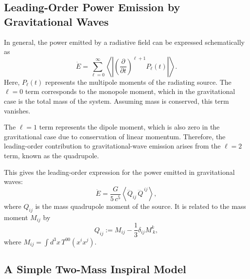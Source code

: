 \documentclass[11pt]{article}
\begin{document}

\subsection*{Leading-Order Power Emission by Gravitational Waves}
\label{subsec:GW_power}

In general, the power emitted by a radiative field can be expressed schematically as
\begin{equation}
    \dot{E} = \sum_{\ell = 0}^{\infty} \left\langle \left| \left( \frac{\partial}{\partial t} \right)^{\ell+1} P_\ell(t) \right| \right\rangle.
\end{equation}
Here, \(P_{\ell}(t)\) represents the multipole moments of the radiating source. The \(\ell = 0\) term corresponds to the monopole moment, which in the gravitational case is the total mass of the system. Assuming mass is conserved, this term vanishes.

\noindent
The \(\ell = 1\) term represents the dipole moment, which is also zero in the gravitational case due to conservation of linear momentum. Therefore, the leading-order contribution to gravitational-wave emission arises from the \(\ell = 2\) term, known as the quadrupole.

\noindent
This gives the leading-order expression for the power emitted in gravitational waves:
\begin{equation}
\dot{E} = \frac{G}{5\,c^5}
\left\langle \dddot{Q}_{ij}\,\dddot{Q}^{\,ij} \right\rangle,
\end{equation}
where \(Q_{ij}\) is the mass quadrupole moment of the source. It is related to the mass moment \(M_{ij}\) by
\begin{equation}
Q_{ij} := M_{ij} - \frac{1}{3} \delta_{ij} M^k_{\ k},
\end{equation}
where \(M_{ij} = \int d^3x\, T^{00}(x^i x^j)\).



\subsection*{A Simple Two-Mass Inspiral Model}
\label{subsec:two_mass_example}
\end{document}
